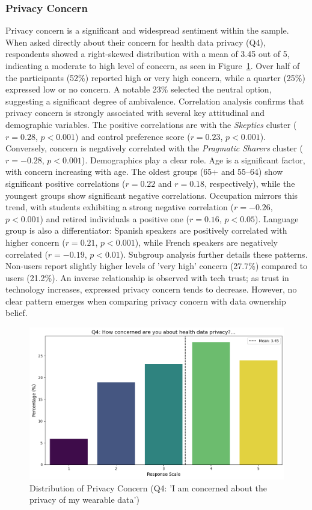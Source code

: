 	\subsubsection{Privacy Concern}
		Privacy concern is a significant and widespread sentiment within the sample. When asked directly about their concern for health data privacy (Q4), respondents showed a right-skewed distribution with a mean of 3.45 out of 5, indicating a moderate to high level of concern, as seen in Figure~\ref{fig:privacy_concern_q4}. Over half of the participants (52\%) reported high or very high concern, while a quarter (25\%) expressed low or no concern. A notable 23\% selected the neutral option, suggesting a significant degree of ambivalence.
		Correlation analysis confirms that privacy concern is strongly associated with several key attitudinal and demographic variables. The positive correlations are with the \textit{Skeptics} cluster ($r = 0.28$, $p < 0.001$) and control preference score ($r = 0.23$, $p < 0.001$). Conversely, concern is negatively correlated with the \textit{Pragmatic Sharers} cluster ($r = -0.28$, $p < 0.001$).
		Demographics play a clear role. Age is a significant factor, with concern increasing with age. The oldest groups (65+ and 55--64) show significant positive correlations ($r = 0.22$ and $r = 0.18$, respectively), while the youngest groups show significant negative correlations. Occupation mirrors this trend, with students exhibiting a strong negative correlation ($r = -0.26$, $p < 0.001$) and retired individuals a positive one ($r = 0.16$, $p < 0.05$). Language group is also a differentiator: Spanish speakers are positively correlated with higher concern ($r = 0.21$, $p < 0.001$), while French speakers are negatively correlated ($r = -0.19$, $p < 0.01$).
		Subgroup analysis further details these patterns. Non-users report slightly higher levels of 'very high' concern (27.7\%) compared to users (21.2\%). An inverse relationship is observed with tech trust; as trust in technology increases, expressed privacy concern tends to decrease. However, no clear pattern emerges when comparing privacy concern with data ownership belief.
		\begin{figure}[h!]\centering
			\includegraphics[width=1\linewidth]{figures/questions/Q4_likert.png}
			\caption{Distribution of Privacy Concern (Q4: 'I am concerned about the privacy of my wearable data')}
			\label{fig:privacy_concern_q4}
		\end{figure}
